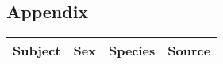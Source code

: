 \newpage
\subsection*{Appendix}


\begin{table}[h]
\centering
\begin{tabular}{|l|l|l|l|}
\hline
\textbf{Subject} & \textbf{Sex} & \textbf{Species} & \textbf{Source} \\

\hline

\end{tabular}
\end{table}
